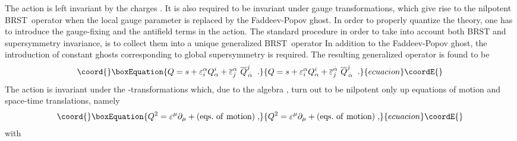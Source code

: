 \documentclass[a4paper,12pt]{article}
\begin{document}
The action \coordHE{} is left invariant by the charges \coordHE{}. It is also
required to be invariant under gauge transformations, which give rise to the
nilpotent BRST\ operator \coordHE{} when the local gauge parameter is replaced by
the Faddeev-Popov ghost. In order to properly quantize the theory, one has
to introduce the gauge-fixing and the antifield terms in the action. The
standard procedure in order to take into account both BRST and supersymmetry
invariance, is to collect them into a unique generalized BRST\ operator \coordHE{} 
\cite{n4,mg,mp}\coordHE{} In addition to the Faddeev-Popov ghost, the introduction
of constant ghosts \coordHE{} corresponding to global supersymmetry is required.
The resulting generalized operator \coordHE{} is found to be 
\begin{equation}\coord{}\boxEquation{
Q=s+\varepsilon _{i}^{\alpha }Q_{\alpha }^{i}+\overline{\varepsilon }_{j}^{
\stackrel{.}{\alpha }}\ \overline{Q}_{\,\stackrel{.}{\alpha }}^{j}\;\;.
\label{q-op}
}{
Q=s+\varepsilon _{i}^{\alpha }Q_{\alpha }^{i}+\overline{\varepsilon }_{j}^{
\stackrel{.}{\alpha }}\ \overline{Q}_{\,\stackrel{.}{\alpha }}^{j}\;\;.
}{ecuacion}\coordE{}\end{equation}
The action \coordHE{} is invariant under the \coordHE{}%
-transformations which, due to the algebra \myHighlight{$\left( \ref{salg}\right) $}\coordHE{}, turn
out to be nilpotent only up equations of motion and space-time translations,
namely 
\begin{equation}\coord{}\boxEquation{
Q^{2}=\varepsilon ^{\mu }\partial _{\mu }+\mathrm{(eqs.\,\,of\,\,motion)\;,}
\label{snil}
}{
Q^{2}=\varepsilon ^{\mu }\partial _{\mu }+\mathrm{(eqs.\,\,of\,\,motion)\;,}
}{ecuacion}\coordE{}\end{equation}
with \myHighlight{$\varepsilon ^{\mu }=$}\coordHE{}  \coordHE{}
\end{document}
